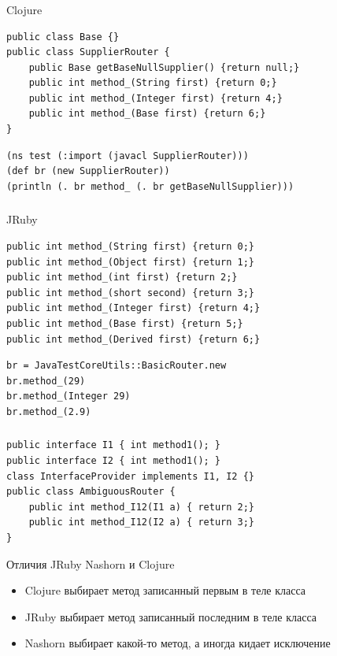 \documentclass[t]{beamer}  %
\begin{document}
\begin{frame}[fragile]
	\frametitle{\insertsection} 
  	\framesubtitle{\insertsubsection}
    \begin{block}{Clojure}
    	    \begin{verbatim}
public class Base {}
public class SupplierRouter {
    public Base getBaseNullSupplier() {return null;}
    public int method_(String first) {return 0;}
    public int method_(Integer first) {return 4;}
    public int method_(Base first) {return 6;}
}
		\end{verbatim}
	    \begin{verbatim}
(ns test (:import (javacl SupplierRouter)))
(def br (new SupplierRouter))
(println (. br method_ (. br getBaseNullSupplier)))
		\end{verbatim}
    \end{block}
\end{frame}

\begin{frame}[fragile]
	\frametitle{\insertsection} 
  	\framesubtitle{\insertsubsection}
    \begin{block}{JRuby}
	\begin{verbatim}
public int method_(String first) {return 0;}
public int method_(Object first) {return 1;}
public int method_(int first) {return 2;}
public int method_(short second) {return 3;}
public int method_(Integer first) {return 4;}
public int method_(Base first) {return 5;}
public int method_(Derived first) {return 6;}
    \end{verbatim}
    	    \begin{verbatim}
br = JavaTestCoreUtils::BasicRouter.new
br.method_(29)
br.method_(Integer 29)
br.method_(2.9)
		\end{verbatim}
    \end{block}
\end{frame}

\begin{frame}[fragile]
	\frametitle{\insertsection} 
  	\framesubtitle{\insertsubsection}
    \begin{verbatim}
public interface I1 { int method1(); }
public interface I2 { int method1(); }
class InterfaceProvider implements I1, I2 {}
public class AmbiguousRouter {
    public int method_I12(I1 a) { return 2;}
    public int method_I12(I2 a) { return 3;}
}
		\end{verbatim}
    \begin{block}{Отличия JRuby Nashorn и Clojure}
    \begin{itemize}
\item<2-> Clojure выбирает метод записанный первым в теле класса
\item<2-> JRuby выбирает метод записанный последним в теле класса
\item<3> Nashorn выбирает какой-то метод, а иногда кидает исключение
    \end{itemize}
    \end{block}
\end{frame}
\end{document}
